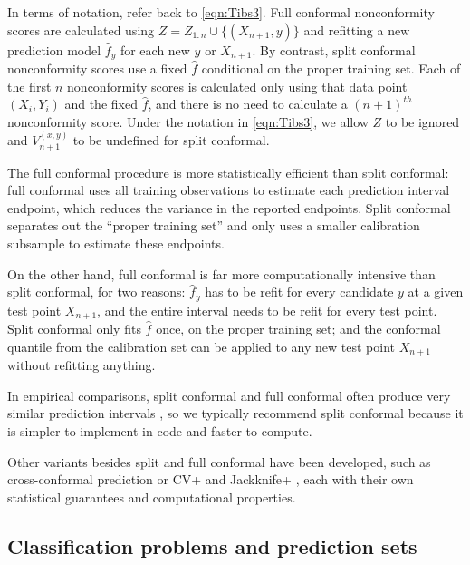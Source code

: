 \documentclass[10.5pt, letterpaper]{article}
\numberwithin{table}{section}
\numberwithin{figure}{section}
\numberwithin{equation}{section}
\begin{document}
In terms of notation, refer back to \eqref{eqn:Tibs3}. Full conformal nonconformity scores are calculated using $Z = Z_{1{:}n} \cup \{(X_{n+1},y)\}$ and refitting a new prediction model $\hat f_y$ for each new $y$ or $X_{n+1}$. By contrast, split conformal nonconformity scores use a fixed $\hat f$ conditional on the proper training set. Each of the first $n$ nonconformity scores is calculated only using that data point $(X_i,Y_i)$ and the fixed $\hat f$, and there is no need to calculate a $(n+1)^{th}$ nonconformity score. Under the notation in \eqref{eqn:Tibs3}, we allow $Z$ to be ignored and $V_{n+1}^{(x,y)}$ to be undefined for split conformal.


The full conformal procedure is more statistically efficient than split conformal: full conformal uses all training observations to estimate each prediction interval endpoint, which reduces the variance in the reported endpoints. Split conformal separates out the ``proper training set'' and only uses a smaller calibration subsample to estimate these endpoints.

On the other hand, full conformal is far more computationally intensive than split conformal, for two reasons: $\hat f_y$ has to be refit for every candidate $y$ at a given test point $X_{n+1}$, and the entire interval needs to be refit for every test point.
Split conformal only fits $\hat f$ once, on the proper training set; and the conformal quantile from the calibration set can be applied to any new test point $X_{n+1}$ without refitting anything.

In empirical comparisons, split conformal and full conformal often produce very similar prediction intervals \citep{lei2018distribution}, so we typically recommend split conformal because it is simpler to implement in code and faster to compute.

Other variants besides split and full conformal have been developed, such as cross-conformal prediction \citep{vovk2015cross} or CV+ and Jackknife+ \citep{barber2021predictive}, each with their own statistical guarantees and computational properties.


\subsection{Classification problems and prediction sets}
\end{document}
